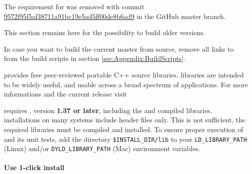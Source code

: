 % 
%               
%          
% 

\leveldown{\texorpdfstring{\protect\marktool{\boostname}}{\boostname{}}}

\begin{noteblock}
The requirement for \marktool{\boostname} was removed with commit 
\href{https://github.com/peridigm/peridigm/commit/9572f95f5af38711a91bc19e5ad5ff00de8b6ad9}{9572f95f5af38711a91bc19e5ad5ff00de8b6ad9} in the GitHub master branch.

This section remains here for the possibility to build older \marktool{\toolname} versions.

In case you want to build the current master from source, remove all links to \marktool{\boostname} from the build scripts in section \ref{sec:Appendix:BuildScripts}. 
\end{noteblock}

\marktool{\boostname} provides free peer-reviewed portable C++ source libraries. \marktool{\boostname} libraries are intended to be widely useful, and usable across a broad spectrum of applications. For more informations and the current release visit

\href{\boostaddress}{\boostaddress}

\marktool{\toolname} requires \marktool{\boostname}, version \textbf{1.37 or later}, including the  and  compiled libraries. \marktool{\boostname} installations on many systems include header files only.  This is not sufficient, the required libraries must be compiled and installed. To ensure proper execution of \marktool{\toolname} and its unit tests, add the \marktool{\boostname} directory \verb+$INSTALL_DIR/lib+ to your \verb+LD_LIBRARY_PATH+ (Linux) and/or \verb+DYLD_LIBRARY_PATH+ (Mac) environment variables.

\paragraph{Use 1-click install}

